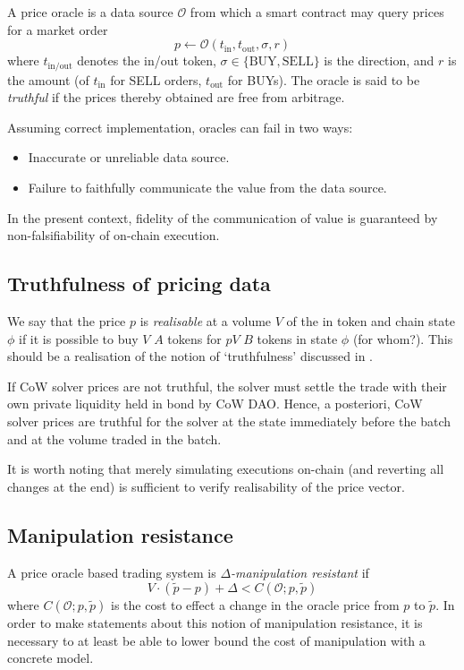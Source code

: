 \documentclass[a4paper,10pt]{article}
\newcommand \oracle {\mathcal{O}}
\begin{document}
A price oracle is a data source $\mathcal{O}$ from which a smart contract may query prices for a market order 
\[
  p \leftarrow \oracle (t_\mathrm{in},t_\mathrm{out},\sigma,r)
\]
where $t_\mathrm{in/out}$ denotes the in/out token, $\sigma\in\{\mathrm{BUY},\mathrm{SELL}\}$ is the direction, and $r$ is the amount (of $t_\mathrm{in}$ for SELL orders, $t_\mathrm{out}$ for BUYs).
%
The oracle is said to be \emph{truthful} if the prices thereby obtained are free from arbitrage.

Assuming correct implementation, oracles can fail in two ways:
\begin{itemize}
  \item Inaccurate or unreliable data source.
  \item Failure to faithfully communicate the value from the data source.
\end{itemize}
In the present context, fidelity of the communication of value is guaranteed by non-falsifiability of on-chain execution.

\subsection{Truthfulness of pricing data}

We say that the price $p$ is \emph{realisable} at a volume $V$ of the in token and chain state $\phi$ if it is possible to buy $V$ $A$ tokens for $pV$ $B$ tokens in state $\phi$ (for whom?).
%
This should be a realisation of the notion of `truthfulness' discussed in \cite{heiss2019oracles}.

If CoW solver prices are not truthful, the solver must settle the trade with their own private liquidity held in bond by CoW DAO.
%
Hence, a posteriori, CoW solver prices are truthful for the solver at the state immediately before the batch and at the volume traded in the batch.

It is worth noting that merely simulating executions on-chain (and reverting all changes at the end) is sufficient to verify realisability of the price vector.

\subsection{Manipulation resistance}

A price oracle based trading system is \emph{$\Delta$-manipulation resistant} if
\[
  V\cdot (\tilde p - p) + \Delta < C(\mathcal{O}; p,\tilde{p})
\]
where $C(\mathcal{O}; p,\tilde{p})$ is the cost to effect a change in the oracle price from $p$ to $\tilde{p}$.
%
In order to make statements about this notion of manipulation resistance, it is necessary to at least be able to lower bound the cost of manipulation with a concrete model.
\end{document}
